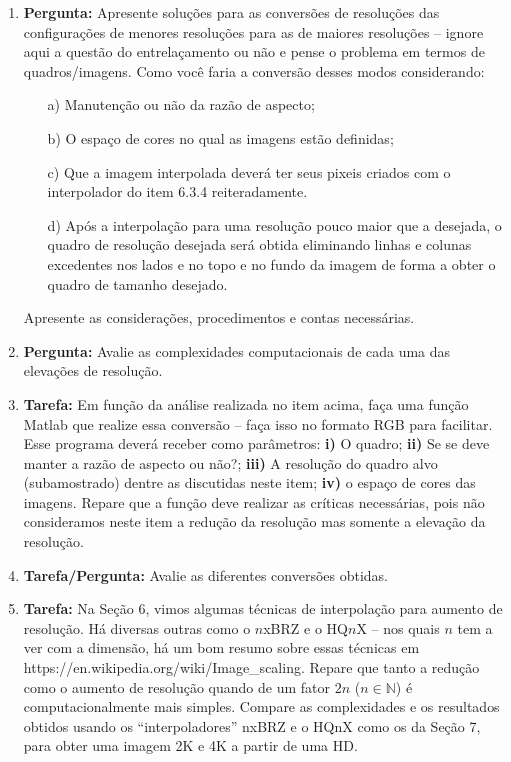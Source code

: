 \documentclass[11pt]{article}
\begin{document}
\begin{enumerate}

\item \textbf{Pergunta:} Apresente soluções para as conversões de resoluções das configurações de menores resoluções para as de maiores resoluções -- ignore aqui a questão do entrelaçamento ou não e pense o problema em termos de quadros/imagens. Como você faria a conversão desses modos considerando:
\begin{enumerate}
\item[a)] Manutenção ou não da razão de aspecto;
\item[b)] O espaço de cores no qual as imagens estão definidas;
\item[c)] Que a imagem interpolada deverá ter seus pixeis criados com o interpolador do item 6.3.4 reiteradamente.
\item[d)] Após a interpolação para uma resolução pouco maior que a desejada, o quadro de resolução desejada será obtida eliminando linhas e colunas excedentes nos lados e no topo e no fundo da imagem de forma a obter o quadro de tamanho desejado.
\end{enumerate}

Apresente as considerações, procedimentos e contas necessárias.

\item \textbf{Pergunta:} Avalie as complexidades computacionais de cada uma das elevações de resolução.

\item \textbf{Tarefa:} Em função da análise realizada no item acima, faça uma função \textsf{Matlab} que realize essa conversão -- faça isso no formato RGB para facilitar. Esse programa deverá receber como parâmetros: \textbf{i)} O quadro; \textbf{ii)} Se se deve manter a razão de aspecto ou não?; \textbf{iii)} A resolução do quadro alvo (subamostrado) dentre as discutidas neste item; \textbf{iv)} o espaço de cores das imagens. Repare que a função deve realizar as críticas necessárias, pois não consideramos neste item a redução da resolução mas somente a elevação da resolução.

\item \textbf{Tarefa/Pergunta:} Avalie as diferentes conversões obtidas.

\item \textbf{Tarefa:} Na Seção 6, vimos algumas técnicas de interpolação para aumento de resolução. Há diversas outras como o $n$xBRZ e o HQ$n$X -- nos quais $n$ tem a ver com a dimensão, há um bom resumo sobre essas técnicas em \textsf{https://en.wikipedia.org/wiki/Image\_scaling}. Repare que tanto a redução como o aumento de resolução quando de um fator $2n$ ($n \in \mathbb{N}$) é computacionalmente mais simples. Compare as complexidades e os resultados obtidos usando os ``interpoladores'' nxBRZ e o HQnX como os da Seção 7, para obter uma imagem 2K e 4K a partir de uma HD.  

\end{enumerate}
\end{document}
